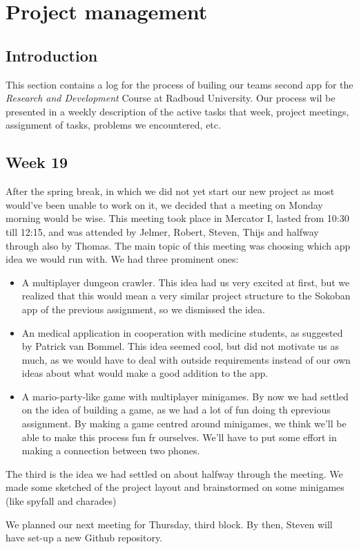 \documentclass[../main.tex]{subfiles}
\begin{document}
\pagebreak
\section{Project management}
\subsection*{Introduction}
This section contains a log for the process of builing our teams second app for the \textit{Research and Development} Course at Radboud University.
Our process wil be presented in a weekly description of the active tasks that week, project meetings, assignment of tasks, problems we encountered, etc.

\subsection*{Week 19}
After the spring break, in which we did not yet start our new project as most would've been unable to work on it, we decided that a meeting on Monday morning would be wise. This meeting took place in Mercator I, lasted from 10:30 till 12:15, and was attended by Jelmer, Robert, Steven, Thijs and halfway through also by Thomas.
The main topic of this meeting was choosing which app idea we would run with. We had three prominent ones:
\begin{itemize}
	\item A multiplayer dungeon crawler. This idea had us very excited at first, but we realized that this would mean a very similar project structure to the Sokoban app of the previous assignment, so we dismissed the idea.
	\item An medical application in cooperation with medicine students, as suggested by Patrick van Bommel. This idea seemed cool, but did not motivate us as much, as we would have to deal with outside requirements instead of our own ideas about what would make a good addition to the app.
	\item A mario-party-like game with multiplayer minigames. By now we had settled on the idea of building a game, as we had a lot of fun doing th eprevious assignment. By making a game centred around minigames, we think we'll be able to make this process fun fr ourselves. We'll have to put some effort in making a connection between two phones.
\end{itemize}

The third is the idea we had settled on about halfway through the meeting. We made some sketched of the project layout and brainstormed on some minigames (like spyfall and charades)

We planned our next meeting for Thursday, third block. By then, Steven will have set-up a new Github repository.
\end{document}

